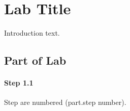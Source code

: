 
\section{Lab Title}

Introduction text.


\subsection{Part of Lab}


\paragraph{Step 1.1} Step are numbered (part.step number).


